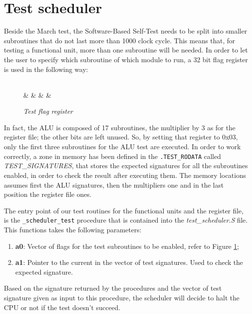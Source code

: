 \documentclass[paper=a4, fontsize=10pt]{scrartcl}	%
\begin{document}
	\section{Test scheduler}
	Beside the March test, the Software-Based Self-Test needs to be split into smaller subroutines that do not last more than 1000 clock cycle. This means that, for testing a functional unit, more than one subroutine will be needed. In order to let the user to specify which subroutine of which module to run, a 32 bit flag register is used in the following way:
	\begin{figure}[ht]
		\begin{center}
			\begin{bytefield}[endianness=big,bitwidth=0.03\linewidth]{32}
				 \\
				 &  &  &   & \\
			\end{bytefield}
		\end{center}
		\caption{\textit{Test flag register}}
		\label{fig:test_flag}
	\end{figure}\newline
	In fact, the ALU is composed of 17 subroutines, the multiplier by 3 as for the register file; the other bits are left unused. So, by setting that register to 0x03, only the first three subroutines for the ALU test are executed.\newline\newline
	In order to work correctly, a zone in memory has been defined in the \texttt{.TEST\_RODATA} called \textit{TEST\_SIGNATURES}, that stores the expected signatures for all the subroutines enabled, in order to check the result after executing them. The memory locations assumes first the ALU signatures, then the multipliers one and in the last position the register file ones.
	
	The entry point of our test routines for the functional units and the register file, is the \texttt{\_scheduler\_test} procedure that is contained into the \textit{test\_scheduler.S} file. This functions takes the following parameters:
	\begin{enumerate}
		\itemsep0sp
		\item \textbf{a0}: Vector of flags for the test subroutines to be enabled, refer to Figure \ref{fig:test_flag};
		\item \textbf{a1}: Pointer to the current in the vector of test signatures. Used to check the expected signature.
	\end{enumerate}
	Based on the signature returned by the procedures and the vector of test signature given as input to this procedure, the scheduler will decide to halt the CPU or not if the test doesn't succeed.
	
\end{document}

